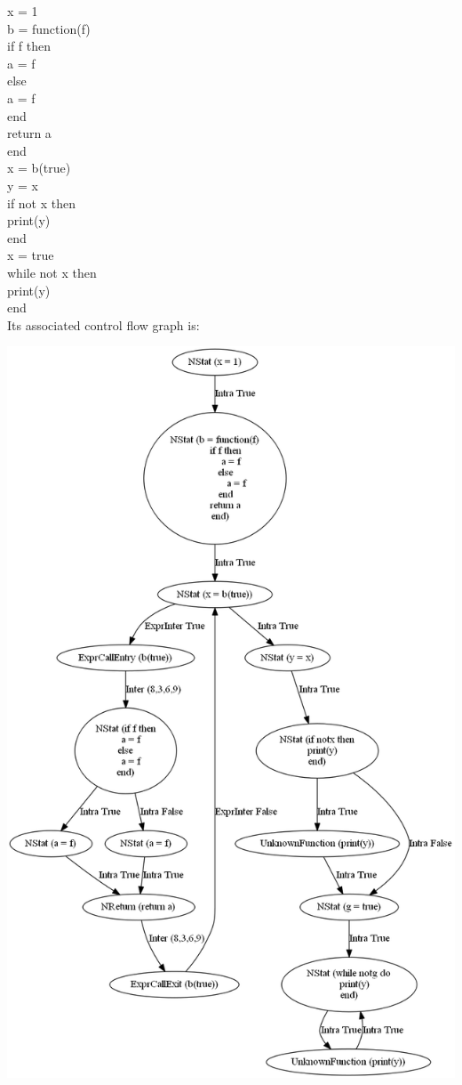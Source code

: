 \documentclass[10pt]{article}
\begin{document}
x = 1\\
b = function(f)\\
if f then\\
a = f\\
else \\
a = f\\
end\\
return a\\
end\\
x = b(true)\\
y = x\\
if not x then\\
print(y)\\
end\\
x = true\\
while not x then\\
print(y)\\
end\\

Its associated control flow graph is:

\includegraphics[scale=0.45]{utTesta.png}
\end{document}
